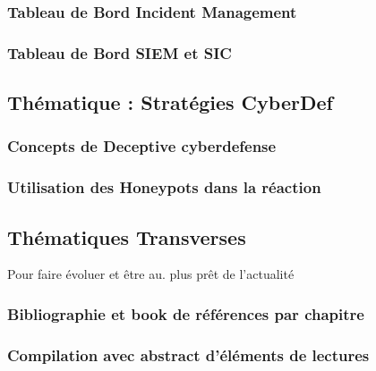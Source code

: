 \subsubsection{Tableau de Bord Incident Management}
\subsubsection{Tableau de Bord SIEM et SIC}


\subsection{Thématique : Stratégies CyberDef}
\subsubsection{Concepts de Deceptive cyberdefense}
\subsubsection{Utilisation des Honeypots dans la réaction }


\subsection{Thématiques Transverses}
Pour faire évoluer et être au. plus prêt de l'actualité
\subsubsection{Bibliographie et book de références par chapitre}
\subsubsection{Compilation avec abstract d'éléments de lectures}

